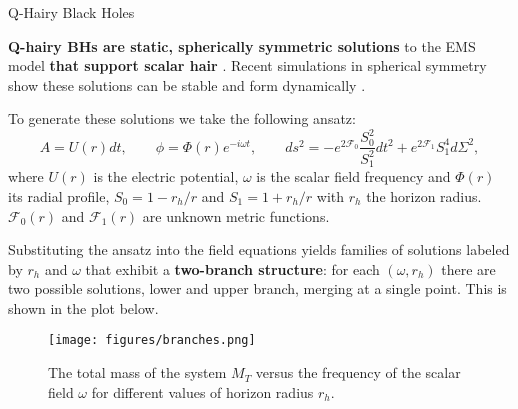 \begin{block}{Q-Hairy Black Holes}

\textbf{Q-hairy \glspl{BH} are static, spherically symmetric solutions} to the \gls{EMS} model \textbf{that support scalar hair} \cite{Herdeiro2020}. Recent simulations in spherical symmetry show these solutions can be stable and form dynamically \cite{Zhang2023}.

To generate these solutions we take the following ansatz:
%
\begin{equation}
    A = U(r) dt, \qquad \phi = \Phi(r) e^{-i \omega t}, \qquad ds^2 = -e^{2\mathcal{F}_0} \frac{S_0^2}{S_1^2} dt^2 + e^{2\mathcal{F}_1} S_1^4 d\Sigma^2,
\end{equation}
%
where $U(r)$ is the electric potential, $\omega$ is the scalar field frequency and $\Phi(r)$ its radial profile, $S_0 = 1 - r_h/r$ and $S_1 = 1 + r_h/r$ with $r_h$ the horizon radius. $\mathcal{F}_0(r)$ and $\mathcal{F}_1(r)$ are unknown metric functions.

Substituting the ansatz into the field equations yields families of solutions labeled by $r_h$ and $\omega$ that exhibit a \textbf{two-branch structure}: for each $(\omega, r_h)$ there are two possible solutions, lower and upper branch, merging at a single point. This is shown in the plot below.

\begin{figure}[h!]
    \centering
    \texttt{[image: figures/branches.png]}
    \caption{The total mass of the system $M_T$ versus the frequency of the scalar field $\omega$ for different values of horizon radius $r_h$.}
\end{figure}

\vspace{-1em}  %

\end{block}

